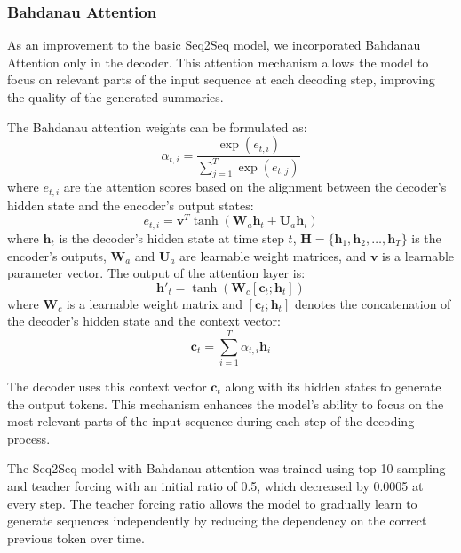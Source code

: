 \subsubsection{Bahdanau Attention}

As an improvement to the basic Seq2Seq model, we incorporated Bahdanau Attention\cite{bahdanau2014neural} only in the decoder. This attention mechanism allows the model to focus on relevant parts of the input sequence at each decoding step, improving the quality of the generated summaries.

The Bahdanau attention weights can be formulated as:
\begin{equation}
    \alpha_{t,i} = \frac{\exp(e_{t,i})}{\sum_{j=1}^{T} \exp(e_{t,j})}
\end{equation}
where \( e_{t,i}\) are the attention scores based on the alignment between the decoder's hidden state and the encoder's output states:
\begin{equation}
    e_{t,i} = \mathbf{v}^T \tanh(\mathbf{W}_a \mathbf{h}_t + \mathbf{U}_a \mathbf{h}_i)
\end{equation}
where \( \mathbf{h}_t \) is the decoder's hidden state at time step \( t \), \( \mathbf{H} = \{\mathbf{h}_1, \mathbf{h}_2, \ldots, \mathbf{h}_T\} \) is the encoder's outputs, \( \mathbf{W}_a \) and \( \mathbf{U}_a \) are learnable weight matrices, and \( \mathbf{v} \) is a learnable parameter vector.
The output of the attention layer is:
\begin{equation}
    \mathbf{h}'_t = \tanh(\mathbf{W}_c [\mathbf{c}_t ; \mathbf{h}_t])
\end{equation}
where \( \mathbf{W}_c \) is a learnable weight matrix and \( [\mathbf{c}_t ; \mathbf{h}_t] \) denotes the concatenation of the decoder's hidden state and the context vector:
\begin{equation}
    \mathbf{c}_t = \sum_{i=1}^{T} \alpha_{t,i} \mathbf{h}_i
\end{equation}

The decoder uses this context vector \( \mathbf{c}_t \) along with its hidden states to generate the output tokens. This mechanism enhances the model's ability to focus on the most relevant parts of the input sequence during each step of the decoding process.

The Seq2Seq model with Bahdanau attention was trained using top-10 sampling and teacher forcing with an initial ratio of 0.5, which decreased by 0.0005 at every step. The teacher forcing ratio allows the model to gradually learn to generate sequences independently by reducing the dependency on the correct previous token over time.

